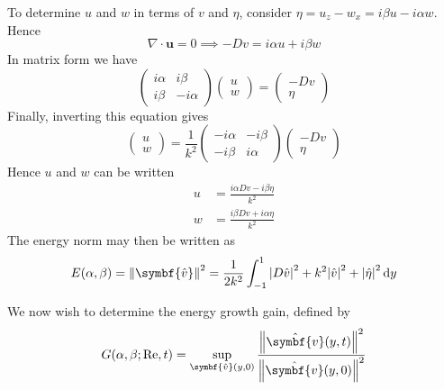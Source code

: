 \documentclass{jknotes}
\renewcommand{\u}{\symbf{u}}
\newcommand{\ReN}{\text{Re}}
\begin{document}
To determine $u$ and $w$ in terms of $v$ and $\eta$, consider $\eta = u_z -
w_x = i\beta u - i\alpha w$. Hence
\begin{equation}
	\nabla \cdot \u = 0 \implies -D v = i\alpha u + i\beta w
\end{equation}
In matrix form we have
\begin{equation}
	\begin{pmatrix} 
		i\alpha & i\beta \\ i\beta & -i\alpha \end{pmatrix} \begin{pmatrix} u
		\\ w \end{pmatrix} = \begin{pmatrix} -D v \\ \eta \end{pmatrix}
\end{equation}
Finally, inverting this equation gives
\begin{equation}
	\begin{pmatrix} u \\ w \end{pmatrix} = \frac{1}{k^2}\begin{pmatrix}
	-i\alpha & -i\beta \\ -i\beta & i\alpha \end{pmatrix} \begin{pmatrix} -Dv
	\\ \eta \end{pmatrix}
\end{equation}
Hence $u$ and $w$ can be written
\begin{align}
	u &= \frac{i\alpha Dv - i\beta \eta}{k^2} \\
	w &= \frac{i\beta Dv + i\alpha \eta}{k^2}
\end{align}
The energy norm may then be written as
\begin{equation}
	E(\alpha, \beta) = \norm{\symbf{\hat{v}}}^2= \frac{1}{2k^2} \int_{-1}^1
	\abs{D \hat{v}}^2 + k^2 \abs{\hat{v}}^2 + \abs{\hat{\eta}}^2 \, \diffd y
	\label{eq:norm}
\end{equation}

We now wish to determine the energy growth gain, defined by
\begin{equation}
	G(\alpha, \beta; \ReN, t) = \sup_{\symbf{\hat{v}}(y,0)}
	\frac{\norm{\hat{\symbf{v}}(y,t)}^2}{\norm{\hat{\symbf{v}}(y,0)}^2}
\end{equation}
\end{document}
